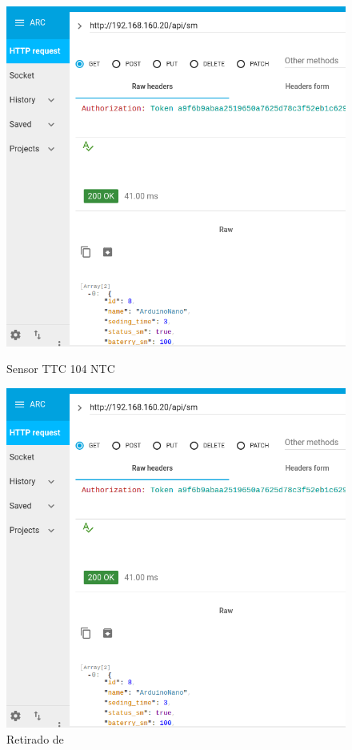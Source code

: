 \begin{figure}[h]
	\centering
	\begin{minipage}[b]{0.49\textwidth}
		\centering
		\includegraphics[width=\textwidth]{prints-web/API_teste1.png}
		\caption{Sensor TTC 104 NTC}
	\end{minipage}
	\hfill
	\begin{minipage}[b]{0.49\textwidth}
		\centering
		\includegraphics[width=\textwidth]{prints-web/API_teste1.png}
		\caption{Retirado de \cite{Rosebrock2015}}
		\label{esquema-temp}
	\end{minipage}
\end{figure}



